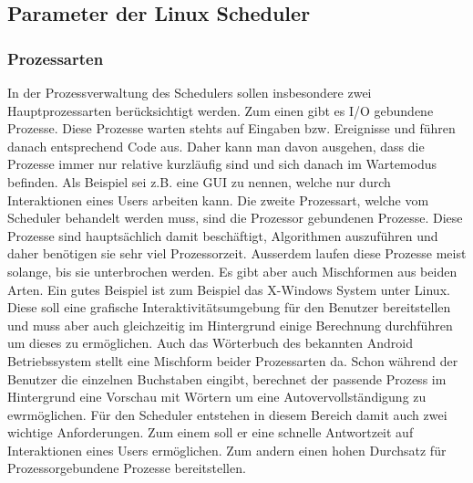 \subsection{Parameter der Linux Scheduler}
\subsubsection{Prozessarten}
In der Prozessverwaltung des Schedulers sollen insbesondere zwei Hauptprozessarten berücksichtigt werden. Zum einen gibt es I/O gebundene Prozesse. Diese Prozesse warten stehts auf Eingaben bzw. Ereignisse und führen danach entsprechend Code aus. Daher kann man davon ausgehen, dass die Prozesse immer nur relative kurzläufig sind und sich danach im Wartemodus befinden. Als Beispiel sei z.B. eine GUI zu nennen, welche nur durch Interaktionen eines Users arbeiten kann.
Die zweite Prozessart, welche vom Scheduler behandelt werden muss, sind die Prozessor gebundenen Prozesse. Diese Prozesse sind hauptsächlich damit beschäftigt, Algorithmen auszuführen und daher be\-nötigen sie sehr viel Prozessorzeit. Ausserdem laufen diese Prozesse meist solange, bis sie unterbrochen werden.
Es gibt aber auch Mischformen aus beiden Arten. Ein gutes Beispiel ist zum Beispiel das X-Windows System unter Linux. Diese soll eine grafische Interaktivitätsumgebung für den Benutzer bereitstellen und muss aber auch gleichzeitig im Hintergrund einige Berechnung durchführen um dieses zu ermöglichen. 
Auch das Wörterbuch des bekannten Android Betriebssystem stellt eine Mischform beider Prozessarten da. Schon während der Benutzer die einzelnen Buchstaben eingibt, berechnet der passende Prozess im Hintergrund eine Vorschau mit Wörtern um eine Autovervollständigung zu ewrmöglichen.
Für den Scheduler entstehen in diesem Bereich damit auch zwei wichtige Anforderungen. Zum einem soll er eine schnelle Antwortzeit auf Interaktionen eines Users ermöglichen. Zum andern einen hohen Durchsatz für Prozessorgebundene Prozesse bereitstellen.

